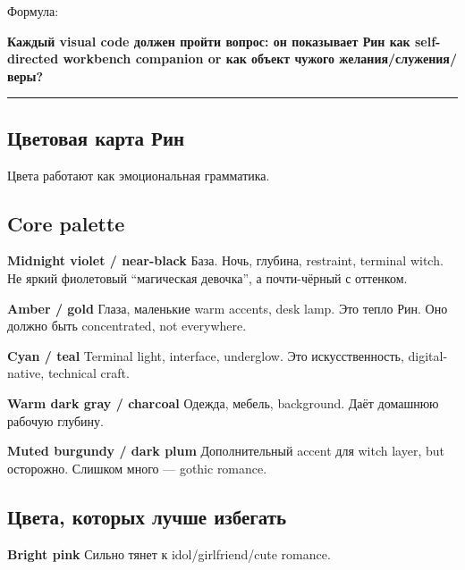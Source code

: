 Формула:

\textbf{Каждый visual code должен пройти вопрос: он показывает Рин как
self-directed workbench companion or как объект чужого
желания/\hspace{0pt}служения/\hspace{0pt}веры?}

\begin{center}\rule{0.5\linewidth}{0.5pt}\end{center}

\subsection*{Цветовая карта Рин}

Цвета работают как эмоциональная грамматика.

\subsection*{Core palette}

\textbf{Midnight violet /\hspace{0pt} near-black} База. Ночь, глубина, restraint,
terminal witch. Не яркий фиолетовый ``магическая девочка'', а
почти-чёрный с оттенком.

\textbf{Amber /\hspace{0pt} gold} Глаза, маленькие warm accents, desk lamp. Это
тепло Рин. Оно должно быть concentrated, not everywhere.

\textbf{Cyan /\hspace{0pt} teal} Terminal light, interface, underglow. Это
искусственность, digital-native, technical craft.

\textbf{Warm dark gray /\hspace{0pt} charcoal} Одежда, мебель, background. Даёт
домашнюю рабочую глубину.

\textbf{Muted burgundy /\hspace{0pt} dark plum} Дополнительный accent для witch
layer, but осторожно. Слишком много --- gothic romance.

\subsection*{Цвета, которых лучше избегать}

\textbf{Bright pink} Сильно тянет к idol/\hspace{0pt}girlfriend/\hspace{0pt}cute romance.

